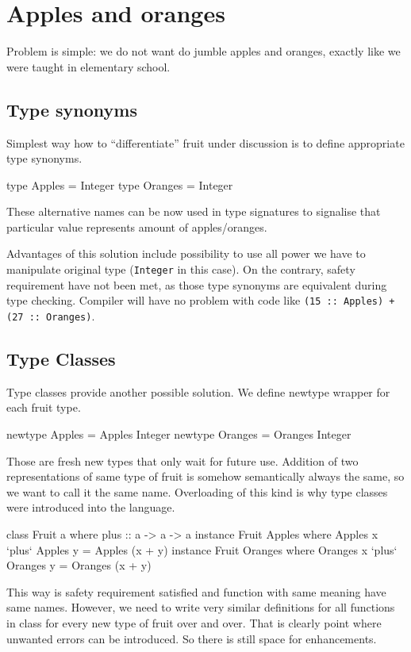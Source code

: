 \documentclass[11pt,oneside,draft]{fithesis2}
\newcommand\uv[1]{``#1''}
\theoremstyle{definition}
\begin{document}
\section{Apples and oranges}

Problem is simple: we do not want do jumble apples and oranges,
exactly like we were taught in elementary school.

\subsection{Type synonyms}

Simplest way how to \uv{differentiate} fruit under discussion is to define
appropriate type synonyms.
\begin{code}
type Apples  = Integer
type Oranges = Integer
\end{code}
These alternative names can be now used in type signatures to signalise that
particular value represents amount of apples/oranges.

Advantages of this solution include possibility to use all power we have
to manipulate original type (\texttt{Integer} in this case). On the contrary,
safety requirement have not been met, as those type synonyms are equivalent
during type checking. Compiler will have no problem with
code like \texttt{(15 :: Apples) + (27 :: Oranges)}.

\subsection{Type Classes}

Type classes provide another possible solution. We define newtype wrapper
for each fruit type.
\begin{code}
newtype Apples  = Apples  Integer
newtype Oranges = Oranges Integer
\end{code}

Those are fresh new types that only wait for future use.
Addition of two representations of same type of fruit is somehow semantically
always the same, so we want to call it the same name. Overloading of this kind is why
type classes were introduced into the language.
\begin{code}
class Fruit a where
    plus :: a -> a -> a
instance Fruit Apples where
	Apples x `plus` Apples y = Apples (x + y)
instance Fruit Oranges where
	Oranges x `plus` Oranges y = Oranges (x + y)
\end{code}

This way is safety requirement satisfied and function
with same meaning have same names. However, we need to write
very similar definitions for all functions in class
for every new type of fruit over and over. That is clearly
point where unwanted errors can be introduced. So there is still
space for enhancements.
\end{document}
